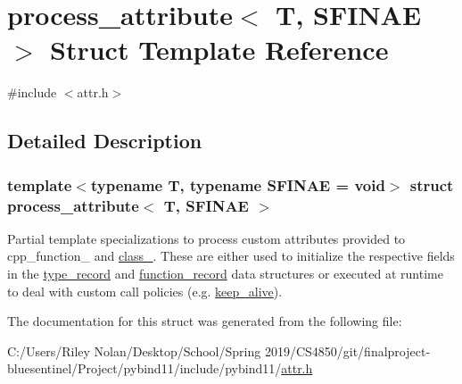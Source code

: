\hypertarget{structprocess__attribute}{}\section{process\+\_\+attribute$<$ T, S\+F\+I\+N\+AE $>$ Struct Template Reference}
\label{structprocess__attribute}


{\ttfamily \#include $<$attr.\+h$>$}



\subsection{Detailed Description}
\subsubsection*{template$<$typename T, typename S\+F\+I\+N\+AE = void$>$\newline
struct process\+\_\+attribute$<$ T, S\+F\+I\+N\+A\+E $>$}

Partial template specializations to process custom attributes provided to cpp\+\_\+function\+\_\+ and \mbox{\hyperlink{classclass__}{class\+\_\+}}. These are either used to initialize the respective fields in the \mbox{\hyperlink{structtype__record}{type\+\_\+record}} and \mbox{\hyperlink{structfunction__record}{function\+\_\+record}} data structures or executed at runtime to deal with custom call policies (e.\+g. \mbox{\hyperlink{structkeep__alive}{keep\+\_\+alive}}). 

The documentation for this struct was generated from the following file\+:\begin{DoxyCompactItemize}
\item 
C\+:/\+Users/\+Riley Nolan/\+Desktop/\+School/\+Spring 2019/\+C\+S4850/git/finalproject-\/bluesentinel/\+Project/pybind11/include/pybind11/\mbox{\hyperlink{attr_8h}{attr.\+h}}\end{DoxyCompactItemize}
